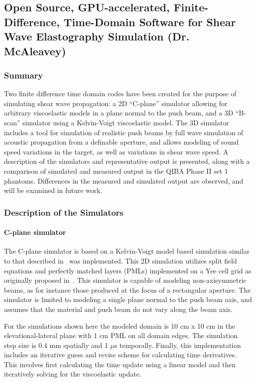 \subsection{Open Source, GPU-accelerated, Finite-Difference, Time-Domain Software for Shear Wave Elastography Simulation (Dr. McAleavey)}

\subsubsection{Summary}
Two finite difference time domain codes have been created for the purpose of
simulating shear wave propagation: a 2D ``C-plane'' simulator allowing for
arbitrary viscoelastic models in a plane normal to the push beam, and a 3D
“B-scan” simulator using a Kelvin-Voigt viscoelastic model. The 3D simulator
includes a tool for simulation of realistic push beams by full wave simulation
of acoustic propagation from a definable aperture, and allows modeling of sound
speed variations in the target, as well as variations in shear wave speed. A
description of the simulators and representative output is presented, along
with a comparison of simulated and measured output in the QIBA Phase II set 1
phantoms. Differences in the measured and simulated output are observed, and
will be examined in future work. 

\subsubsection{Description of the Simulators}

\paragraph{C-plane simulator}
The C-plane simulator is based on a Kelvin-Voigt model based simulation similar
to that described in~\cite{Orescanin2011} was implemented. This 2D simulation
utilizes split field equations and perfectly matched layers (PMLs) implemented
on a Yee cell grid as originally proposed in~\cite{Berenger1994}. This
simulator is capable of modeling non-axisymmetric beams, as for instance those
produced at the focus of a rectangular aperture. The simulator is limited to
modeling a single plane normal to the push beam axis, and assumes that the
material and push beam do not vary along the beam axis. 

For the simulations shown here the modeled domain is 10 cm x 10 cm in the
elevational-lateral plane with 1 cm PML on all domain edges. The simulation
step size is 0.4 mm spatially and 1 $\mu$s temporally. Finally, this
implementation includes an iterative guess and revise scheme for calculating
time derivatives.  This involves first calculating the time update using a
linear model and then iteratively solving for the viscoelastic update. 

